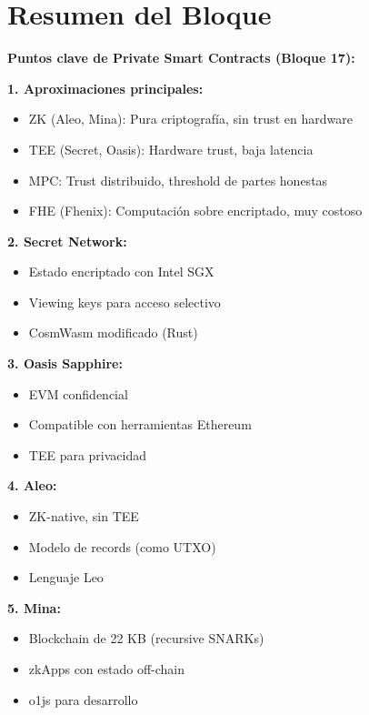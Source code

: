 \documentclass[11pt,a4paper,twoside]{book}
\theoremstyle{definition}
\theoremstyle{remark}
\begin{document}
\section*{Resumen del Bloque}

\begin{keyidea}
\textbf{Puntos clave de Private Smart Contracts (Bloque 17):}

\textbf{1. Aproximaciones principales:}
\begin{itemize}
    \item ZK (Aleo, Mina): Pura criptografía, sin trust en hardware
    \item TEE (Secret, Oasis): Hardware trust, baja latencia
    \item MPC: Trust distribuido, threshold de partes honestas
    \item FHE (Fhenix): Computación sobre encriptado, muy costoso
\end{itemize}

\textbf{2. Secret Network:}
\begin{itemize}
    \item Estado encriptado con Intel SGX
    \item Viewing keys para acceso selectivo
    \item CosmWasm modificado (Rust)
\end{itemize}

\textbf{3. Oasis Sapphire:}
\begin{itemize}
    \item EVM confidencial
    \item Compatible con herramientas Ethereum
    \item TEE para privacidad
\end{itemize}

\textbf{4. Aleo:}
\begin{itemize}
    \item ZK-native, sin TEE
    \item Modelo de records (como UTXO)
    \item Lenguaje Leo
\end{itemize}

\textbf{5. Mina:}
\begin{itemize}
    \item Blockchain de 22 KB (recursive SNARKs)
    \item zkApps con estado off-chain
    \item o1js para desarrollo
\end{itemize}


\end{keyidea}
\end{document}
